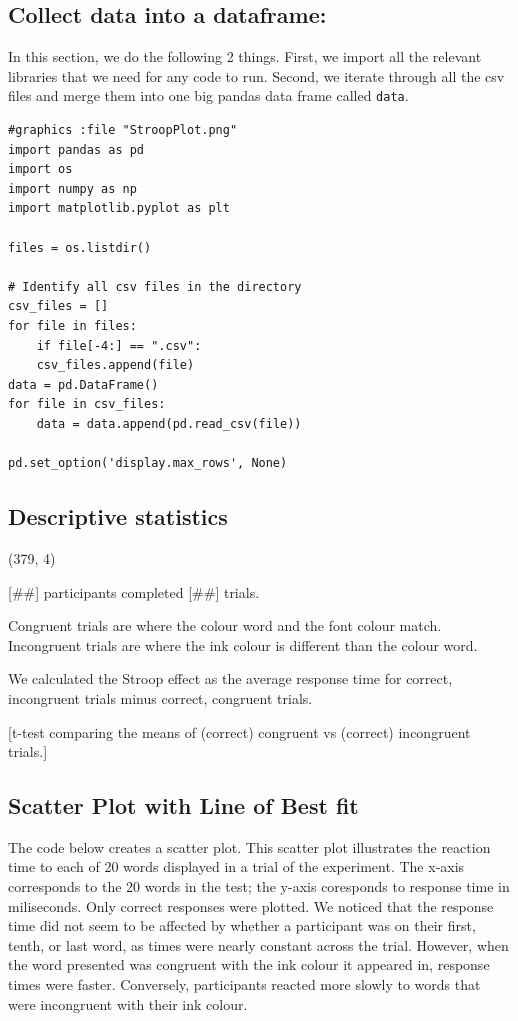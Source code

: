 \documentclass{article}
\begin{document}
\subsection{Collect data into a dataframe:}
\label{sec:org69698fb}

In this section, we do the following 2 things. First, we import all the relevant libraries that we need for any code to run. Second, we iterate through all the csv files and merge them into one big pandas data frame called \texttt{data}.

\begin{verbatim}
#graphics :file "StroopPlot.png"
import pandas as pd
import os
import numpy as np
import matplotlib.pyplot as plt

files = os.listdir()

# Identify all csv files in the directory
csv_files = []
for file in files:
    if file[-4:] == ".csv":
	csv_files.append(file)
data = pd.DataFrame()
for file in csv_files:
    data = data.append(pd.read_csv(file))

pd.set_option('display.max_rows', None)
\end{verbatim}

\pagebreak
\setlength{\voffset}{-0.75in}

\subsection{Descriptive statistics}
\label{sec:org7a993fd}

(379, 4)

[\#\#] participants completed [\#\#] trials.


Congruent trials are where the colour word and the font colour match. Incongruent trials are where the ink colour is different than the colour word.


We calculated the Stroop effect as the average response time for correct, incongruent trials minus correct, congruent trials.

[t-test comparing the means of (correct) congruent vs (correct) incongruent trials.]



\subsection{Scatter Plot with Line of Best fit}
\label{sec:orga3b00b7}

The code below creates a scatter plot. This scatter plot illustrates the reaction time to each of 20 words displayed in a trial of the experiment. The x-axis corresponds to the 20 words in the test; the y-axis coresponds to response time in miliseconds. Only correct responses were plotted. We noticed that the response time did not seem to be affected by whether a participant was on their first, tenth, or last word, as times were nearly constant across the trial. However, when the word presented was congruent with the ink colour it appeared in, response times were faster. Conversely, participants reacted more slowly to words that were incongruent with their ink colour.
\end{document}
